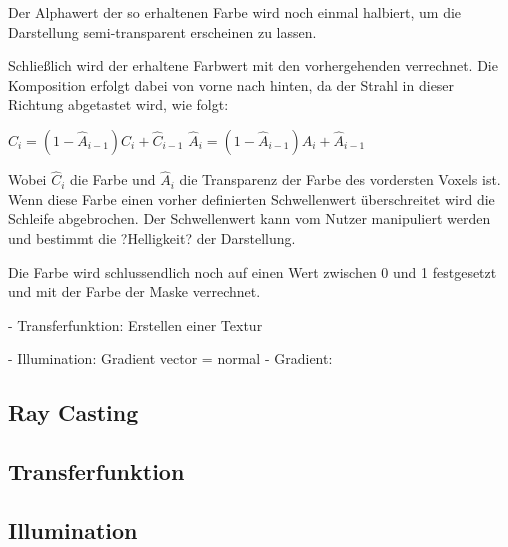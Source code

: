 Der Alphawert der so erhaltenen Farbe wird noch einmal halbiert, um die Darstellung semi-transparent erscheinen zu lassen.

Schließlich wird der erhaltene Farbwert mit den vorhergehenden verrechnet. Die Komposition erfolgt dabei von vorne nach hinten, da der Strahl in dieser Richtung abgetastet wird, wie folgt:

$\hat{C}_{i}=(1-\hat{A}_{i-1})C_{i}+\hat{C}_{i-1}$
$\hat{A}_{i}=(1-\hat{A}_{i-1})A_{i}+\hat{A}_{i-1}$

Wobei $\hat{C}_{i}$ die Farbe und $\hat{A}_{i}$ die Transparenz der Farbe des vordersten Voxels ist.
Wenn diese Farbe einen vorher definierten Schwellenwert überschreitet wird die Schleife abgebrochen. Der Schwellenwert kann vom Nutzer manipuliert werden und bestimmt die ?Helligkeit? der Darstellung.

Die Farbe wird schlussendlich noch auf einen Wert zwischen 0 und 1 festgesetzt und mit der Farbe der Maske verrechnet.



- Transferfunktion: Erstellen einer Textur

- Illumination: Gradient vector = normal
- Gradient: 

\subsection{Ray Casting}

\subsection{Transferfunktion}

\subsection{Illumination}